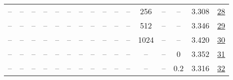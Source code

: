 \begin{table}[H]
\begin{tabular}{cccccccccccccccc}
-- & -- & -- & -- & -- & -- & -- & -- & -- & -- & -- & 256 & -- & -- & 3.308 & \href{https://wandb.ai/stanford-mercury/optimizer-scaling/runs/sweep-130m-10B-muonz4d5315lr0.008-wd0.1-minlr0-warmup0-b10.8-b20-64c74e}{28} \\
-- & -- & -- & -- & -- & -- & -- & -- & -- & -- & -- & 512 & -- & -- & 3.346 & \href{https://wandb.ai/stanford-mercury/optimizer-scaling/runs/sweep-130m-10B-muonze4b457lr0.008-wd0.1-minlr0-warmup0-b10.8-b20-4b4ebe}{29} \\
-- & -- & -- & -- & -- & -- & -- & -- & -- & -- & -- & 1024 & -- & -- & 3.420 & \href{https://wandb.ai/stanford-mercury/optimizer-scaling/runs/sweep-130m-10B-muonz35bd41lr0.008-wd0.1-minlr0-warmup0-b10.8-b20-57a098}{30} \\
-- & -- & -- & -- & -- & -- & -- & -- & -- & -- & -- & -- & -- & 0 & 3.352 & \href{https://wandb.ai/stanford-mercury/optimizer-scaling/runs/sweep-130m-10B-muonvbf1cfdlr0.008-wd0-minlr0-warmup0-b10.8-b20.9-ea634f}{31} \\
-- & -- & -- & -- & -- & -- & -- & -- & -- & -- & -- & -- & -- & 0.2 & 3.316 & \href{https://wandb.ai/stanford-mercury/optimizer-scaling/runs/sweep-130m-10B-muonzf7d090lr0.008-wd0.2-minlr0-warmup0-b10.8-b20-05f51f}{32} \\
\bottomrule
\end{tabular}
\end{table}


